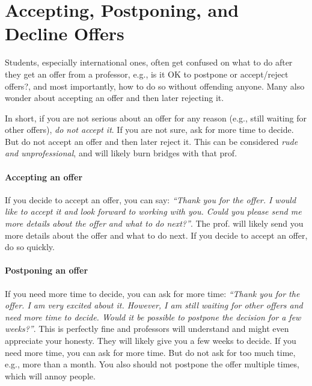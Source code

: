 \documentclass[oneside,11pt,dvipsnames]{book}
\begin{document}

\section{Accepting, Postponing, and Decline Offers}\label{sec:accept-postpone-decline}

Students, especially international ones, often get confused on what to do after they get an offer from a professor, e.g., is it OK to postpone or accept/reject offers?, and most importantly, how to do so without offending anyone. Many also wonder about accepting an offer and then later rejecting it.

In short, if you are not serious about an offer for any reason (e.g., still waiting for other offers), \emph{do not accept it}.
If you are not sure, ask for more time to decide.  But do not accept an offer and then later reject it.  This can be considered \emph{rude and unprofessional}, and will likely burn bridges with that prof.

\paragraph{Accepting an offer} If you decide to accept an offer, you can say: \emph{``Thank you for the offer.  I would like to accept it and look forward to working with you.  Could you please send me more details about the offer and what to do next?''}. The prof. will likely send you more details about the offer and what to do next.  If you decide to accept an offer, do so quickly.


\paragraph{Postponing an offer} If you need more time to decide, you can ask for more time: \emph{``Thank you for the offer.  I am very excited about it.  However, I am still waiting for other offers and need more time to decide.  Would it be possible to postpone the decision for a few weeks?''}.  This is perfectly fine and professors will understand and might even appreciate your honesty.  They will likely give you a few weeks to decide.  If you need more time, you can ask for more time.  But do not ask for too much time, e.g., more than a month.  You also should not postpone the offer multiple times, which will annoy people.
\end{document}

